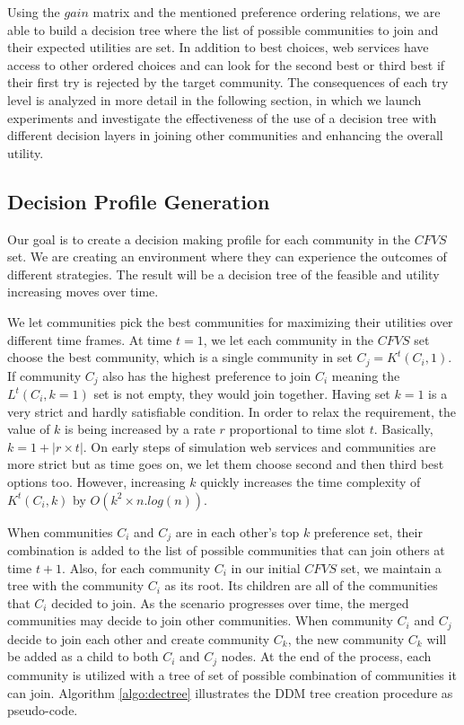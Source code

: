 Using the $gain$ matrix and the mentioned preference ordering relations, we are able to build a decision tree where the list of possible communities to join and their expected utilities are set.
In addition to best choices, web services have access to other ordered choices and can look for the second best or third best if their first try is rejected by the target community. The consequences of each try level is analyzed in more detail in the following section, in which we launch experiments and investigate the effectiveness of the use of a decision tree with different decision layers in joining other communities and enhancing the overall utility.

\subsection{Decision Profile Generation}\label{ss:learningmodel}

Our goal is to create a decision making profile for each community in the $CFVS$ set. We are creating an environment where they can experience the outcomes of different strategies. The result will be a decision tree of the feasible and utility increasing moves over time.

We let communities pick the best communities for maximizing their utilities over different time frames. At time $t = 1$, we let each community in the $CFVS$ set choose the best community, which is a single community in set $C_j = K^t(C_i, 1)$. If community $C_j$ also has the highest preference to join $C_i$ meaning the $L^t(C_i, k=1)$ set is not empty, they would join together. Having set $k = 1$ is a very strict and hardly satisfiable condition. In order to relax the requirement, the value of $k$ is being increased by a rate $r$ proportional to time slot $t$. Basically, $k = 1 + |r \times t|$. On early steps of simulation web services and communities are more strict but as time goes on, we let them choose second and then third best options too. However, increasing $k$ quickly increases the time complexity of $K^t(C_i, k)$ by $O(k^2 \times n.log(n))$.

When communities $C_i$ and $C_j$ are in each other's top $k$ preference set, their combination is added to the list of possible communities that can join others at time $t+1$. Also, for each community $C_i$ in our initial $CFVS$ set, we maintain a tree with the community $C_i$ as its root. Its children are all of the communities that $C_i$ decided to join. As the scenario progresses over time, the merged communities may decide to join other communities. When community $C_i$ and $C_j$ decide to join each other and create community $C_k$, the new community $C_k$ will be added as a child to both $C_i$ and $C_j$ nodes. At the end of the process, each community is utilized with a tree of set of possible combination of communities it can join. Algorithm \ref{algo:dectree} illustrates the DDM tree creation procedure as pseudo-code.

